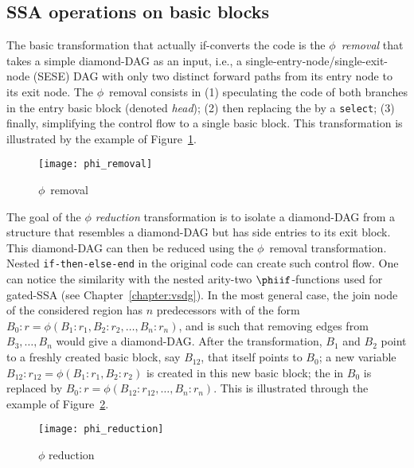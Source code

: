\subsection{SSA operations on basic blocks}

The basic transformation that actually if-converts the code is the \emph{$\phi$~removal} that takes a simple diamond-DAG as an input, i.e., a single-entry-node/single-exit-node (SESE) DAG with only two distinct forward paths from its entry node to its exit node. 
The $\phi$~removal consists in (1) speculating the code of both branches in the entry basic block (denoted \textit{head}); 
(2) then replacing the \phifun by a \texttt{select}; 
(3) finally, simplifying the control flow to a single basic block. 
This transformation is illustrated by the example of Figure~\ref{fig:phi_rem}.
\begin{figure}[h]
  \texttt{[image: phi\_removal]}
  \caption{$\phi$~removal\label{fig:phi_rem}}
\end{figure}

The goal of the \emph{$\phi$ reduction} transformation is to isolate a diamond-DAG from a structure that resembles a diamond-DAG but has side entries to its exit block. 
This diamond-DAG can then be reduced using the $\phi$~removal transformation. 
Nested \texttt{if-then-else-end} in the original code can create such control flow. 
One can notice the similarity with the nested arity-two $\phiif$-functions used for gated-SSA (see Chapter~\ref{chapter:vsdg}). 
In the most general case, the join node of the considered region has $n$ predecessors with \phifuns of the form $B_0:r=\phi(B_1:r_1,B_2:r_2,\dots,B_n:r_n)$, and is such that removing edges from $B_3,\dots, B_n$ would give a diamond-DAG. 
After the transformation, $B_1$ and $B_2$ point to a freshly created basic block, say $B_{12}$, that itself points to $B_0$; 
a new variable $B_{12}:r_{12}=\phi(B_1:r_1,B_2:r_2)$ is created in this new basic block; 
the \phifun in $B_0$ is replaced by $B_0:r=\phi(B_{12}:r_{12},\dots,B_n:r_n)$. 
This is illustrated through the example of Figure~\ref{fig:phi_red}.
\begin{figure}[h]
  \texttt{[image: phi\_reduction]}
  \caption{\label{fig:phi_red}$\phi$ reduction}
\end{figure}

